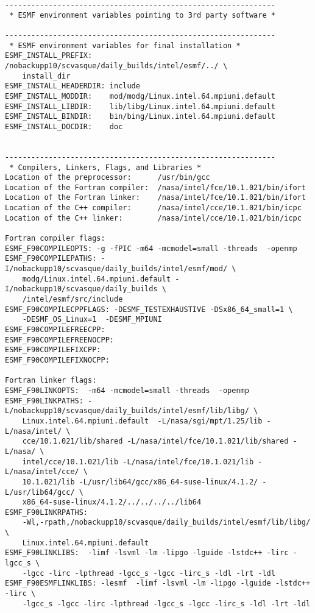 \begin{verbatim}
--------------------------------------------------------------
 * ESMF environment variables pointing to 3rd party software *
 
--------------------------------------------------------------
 * ESMF environment variables for final installation *
ESMF_INSTALL_PREFIX:    /nobackupp10/scvasque/daily_builds/intel/esmf/../ \
	install_dir
ESMF_INSTALL_HEADERDIR: include
ESMF_INSTALL_MODDIR:    mod/modg/Linux.intel.64.mpiuni.default
ESMF_INSTALL_LIBDIR:    lib/libg/Linux.intel.64.mpiuni.default
ESMF_INSTALL_BINDIR:    bin/bing/Linux.intel.64.mpiuni.default
ESMF_INSTALL_DOCDIR:    doc
 
 
--------------------------------------------------------------
 * Compilers, Linkers, Flags, and Libraries *
Location of the preprocessor:      /usr/bin/gcc
Location of the Fortran compiler:  /nasa/intel/fce/10.1.021/bin/ifort
Location of the Fortran linker:    /nasa/intel/fce/10.1.021/bin/ifort
Location of the C++ compiler:      /nasa/intel/cce/10.1.021/bin/icpc
Location of the C++ linker:        /nasa/intel/cce/10.1.021/bin/icpc

Fortran compiler flags:
ESMF_F90COMPILEOPTS: -g -fPIC -m64 -mcmodel=small -threads  -openmp
ESMF_F90COMPILEPATHS: -I/nobackupp10/scvasque/daily_builds/intel/esmf/mod/ \
	modg/Linux.intel.64.mpiuni.default -I/nobackupp10/scvasque/daily_builds \
	/intel/esmf/src/include 
ESMF_F90COMPILECPPFLAGS: -DESMF_TESTEXHAUSTIVE -DSx86_64_small=1 \
	-DESMF_OS_Linux=1  -DESMF_MPIUNI
ESMF_F90COMPILEFREECPP: 
ESMF_F90COMPILEFREENOCPP: 
ESMF_F90COMPILEFIXCPP: 
ESMF_F90COMPILEFIXNOCPP: 

Fortran linker flags:
ESMF_F90LINKOPTS:  -m64 -mcmodel=small -threads  -openmp
ESMF_F90LINKPATHS: -L/nobackupp10/scvasque/daily_builds/intel/esmf/lib/libg/ \
	Linux.intel.64.mpiuni.default  -L/nasa/sgi/mpt/1.25/lib -L/nasa/intel/ \
	cce/10.1.021/lib/shared -L/nasa/intel/fce/10.1.021/lib/shared -L/nasa/ \
	intel/cce/10.1.021/lib -L/nasa/intel/fce/10.1.021/lib -L/nasa/intel/cce/ \
	10.1.021/lib -L/usr/lib64/gcc/x86_64-suse-linux/4.1.2/ -L/usr/lib64/gcc/ \
	x86_64-suse-linux/4.1.2/../../../../lib64
ESMF_F90LINKRPATHS: 
	-Wl,-rpath,/nobackupp10/scvasque/daily_builds/intel/esmf/lib/libg/ \
	Linux.intel.64.mpiuni.default
ESMF_F90LINKLIBS:  -limf -lsvml -lm -lipgo -lguide -lstdc++ -lirc -lgcc_s \
	-lgcc -lirc -lpthread -lgcc_s -lgcc -lirc_s -ldl -lrt -ldl
ESMF_F90ESMFLINKLIBS: -lesmf  -limf -lsvml -lm -lipgo -lguide -lstdc++ -lirc \
	-lgcc_s -lgcc -lirc -lpthread -lgcc_s -lgcc -lirc_s -ldl -lrt -ldl


\end{verbatim}
